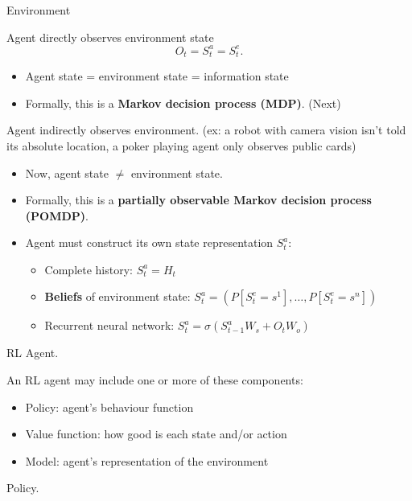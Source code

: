 \documentclass[english]{article}
\begin{document}
\item {Environment}
\begin{definition}
Agent directly observes environment state
\[ O_t = S^a_t = S^e_t. \]
\begin{itemize}
    \item Agent state = environment
state = information state
    \item Formally, this is a \textbf{Markov
decision process (MDP)}. (Next)
\end{itemize}
\end{definition}


\begin{definition}
Agent indirectly observes environment. (ex: a robot with camera vision isn't told its absolute location, a poker playing agent only observes public cards)
\begin{itemize}
    \item Now, agent state $\neq$ environment state.
    \item Formally, this is a \textbf{partially observable Markov decision process (POMDP)}. 
    \item Agent must construct its own state representation $S^a_t$:
    \begin{itemize}
        \item Complete history: $S^a_t = H_t$
        \item \textbf{Beliefs} of environment state: $S^a_t = (P[S^e_t = s^1],\dots,P[S^e_t = s^n])$
        \item Recurrent neural network: $S^a_t = \sigma\left( S^a_{t-1}W_s + O_t W_o \right)$
    \end{itemize}
\end{itemize}
\end{definition}



\item {RL Agent}.

An RL agent may include one or more of these components:
\begin{itemize}
    \item Policy: agent's behaviour function
    \item Value function: how good is each state and/or action
    \item Model: agent's representation of the environment
\end{itemize}


\item {Policy}.
\end{document}

